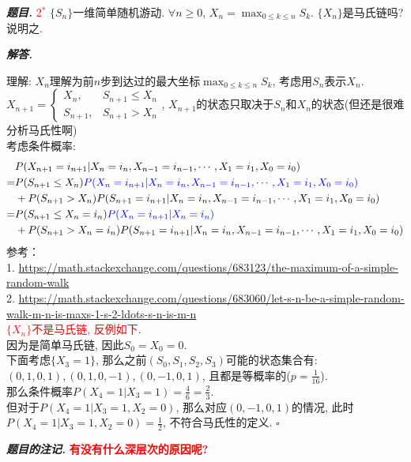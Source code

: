 \documentclass[10pt, a4paper, oneside]{ctexart}
\newenvironment{problem}{\begin{framed}\par\noindent\textbf{\textit{题目. }}}{\end{framed}\par}
\newenvironment{solution}{%
  \par\noindent\textbf{\textit{解答. }}\ignorespaces
}{%
  \hfill\ensuremath{\square}\par %
}
\newenvironment{note}{\par\noindent\textbf{\textit{题目的注记. }}\ignorespaces}{\par}
\begin{document}
\begin{problem}
\textcolor{red}{2$^*$} $\{S_n\}$一维简单随机游动. $\forall n\geq 0$, $X_n=\max_{0\leq k\leq n}S_k$. $\{X_n\}$是马氏链吗? 说明之. 
\end{problem}
\begin{solution}
理解: $X_n$理解为前$n$步到达过的最大坐标$\max_{0\leq k\leq n}S_k$, 考虑用$S_n$表示$X_n$. \\$X_{n+1}=\begin{cases}
    X_n, & S_{n+1}\leq X_n\\
    S_{n+1}, &S_{n+1}>X_n
\end{cases}$, $X_{n+1}$的状态只取决于$S_n$和$X_n$的状态(但还是很难分析马氏性啊)\\ 
考虑条件概率:
\begin{align*}
    &P(X_{n+1}=i_{n+1}|X_{n}=i_n,X_{n-1}=i_{n-1},\cdots,X_1=i_1,X_0=i_0)\\
    =&P(S_{n+1}\leq X_n)\textcolor{blue}{P(X_n=i_{n+1}|X_{n}=i_n,X_{n-1}=i_{n-1},\cdots,X_1=i_1,X_0=i_0)}\\&+P(S_{n+1}>X_n)P(S_{n+1}=i_{n+1}|X_{n}=i_n,X_{n-1}=i_{n-1},\cdots,X_1=i_1,X_0=i_0)\\
    =&P(S_{n+1}\leq X_n=i_n)\textcolor{blue}{P(X_n=i_{n+1}|X_{n}=i_n)}\\&+P(S_{n+1}>X_n=i_n)P(S_{n+1}=i_{n+1}|X_{n}=i_n,X_{n-1}=i_{n-1},\cdots,X_1=i_1,X_0=i_0)
\end{align*}
参考：\\
1. \url{https://math.stackexchange.com/questions/683123/the-maximum-of-a-simple-random-walk}\\
2. \url{https://math.stackexchange.com/questions/683060/let-s-n-be-a-simple-random-walk-m-n-is-maxs-1-s-2-ldots-s-n-is-m-n}\\
\textcolor{red}{$\{X_n\}$不是马氏链, 反例如下}.\\
因为是简单马氏链, 因此$S_0=X_0=0$. \\下面考虑$\{X_3=1\}$, 那么之前${(S_0,S_1,S_2,S_3)}$可能的状态集合有:$(0,1,0,1),(0,1,0,-1),(0,-1,0,1)$, 且都是等概率的($p=\frac{1}{16}$). \\那么条件概率$P(X_4=1|X_3=1)=\frac{4}{6}=\frac{2}{3}$. \\但对于$P(X_4=1|X_3=1,X_2=0)$, 那么对应$(0,-1,0,1)$的情况, 此时$P(X_4=1|X_3=1,X_2=0)=\frac{1}{2}$, 不符合马氏性的定义.
\end{solution}
\begin{note}
    \textbf{\textcolor{red}{有没有什么深层次的原因呢?}}
\end{note}
\end{document}
